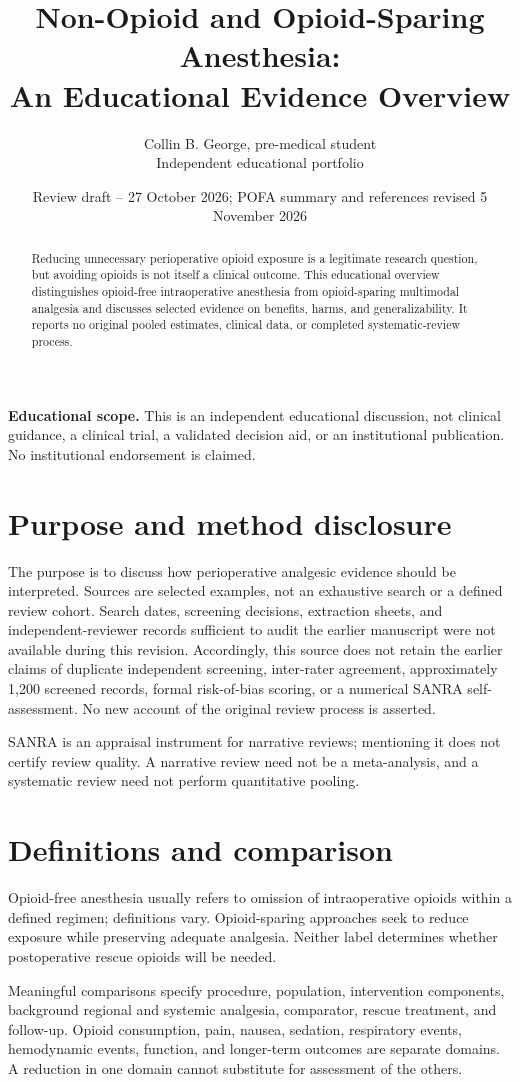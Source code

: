 \documentclass[11pt]{article}
\title{Non-Opioid and Opioid-Sparing Anesthesia:\\An Educational Evidence Overview}
\author{Collin B. George, pre-medical student\\Independent educational portfolio}
\date{Review draft -- 27 October 2026; POFA summary and references revised 5 November 2026}
\begin{document}
\maketitle
\noindent\textbf{Educational scope.} This is an independent educational discussion, not clinical guidance, a clinical trial, a validated decision aid, or an institutional publication. No institutional endorsement is claimed.

\begin{abstract}
Reducing unnecessary perioperative opioid exposure is a legitimate research question, but avoiding opioids is not itself a clinical outcome. This educational overview distinguishes opioid-free intraoperative anesthesia from opioid-sparing multimodal analgesia and discusses selected evidence on benefits, harms, and generalizability. It reports no original pooled estimates, clinical data, or completed systematic-review process.
\end{abstract}
\section{Purpose and method disclosure}
The purpose is to discuss how perioperative analgesic evidence should be interpreted. Sources are selected examples, not an exhaustive search or a defined review cohort. Search dates, screening decisions, extraction sheets, and independent-reviewer records sufficient to audit the earlier manuscript were not available during this revision. Accordingly, this source does not retain the earlier claims of duplicate independent screening, inter-rater agreement, approximately 1,200 screened records, formal risk-of-bias scoring, or a numerical SANRA self-assessment. No new account of the original review process is asserted.

SANRA is an appraisal instrument for narrative reviews; mentioning it does not certify review quality. A narrative review need not be a meta-analysis, and a systematic review need not perform quantitative pooling.
\section{Definitions and comparison}
Opioid-free anesthesia usually refers to omission of intraoperative opioids within a defined regimen; definitions vary. Opioid-sparing approaches seek to reduce exposure while preserving adequate analgesia. Neither label determines whether postoperative rescue opioids will be needed.

Meaningful comparisons specify procedure, population, intervention components, background regional and systemic analgesia, comparator, rescue treatment, and follow-up. Opioid consumption, pain, nausea, sedation, respiratory events, hemodynamic events, function, and longer-term outcomes are separate domains. A reduction in one domain cannot substitute for assessment of the others.
\end{document}

